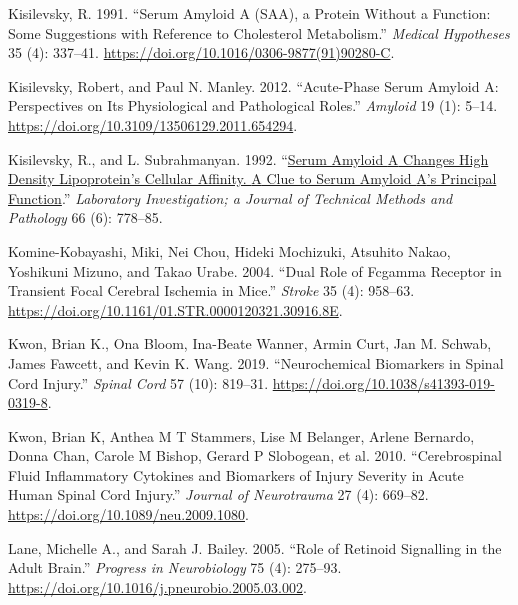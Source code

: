 \documentclass[9pt,lineno]{elife}
\newlength{\cslhangindent}
\newlength{\cslentryspacingunit} %
\newenvironment{CSLReferences}[2] %
 {%
  \setlength{\parindent}{0pt}
  \ifodd #1
  \let\oldpar\par
  \def\par{\hangindent=\cslhangindent\oldpar}
  \fi
  \setlength{\parskip}{#2\cslentryspacingunit}
 }%
 {}
\begin{document}
\begin{landscape}
\begin{landscape}
\begin{landscape}
\begin{landscape}
\begin{CSLReferences}{1}{0}
\leavevmode{}%
Kisilevsky, R. 1991. {``Serum Amyloid {A} ({SAA}), a Protein Without a Function: {Some} Suggestions with Reference to Cholesterol Metabolism.''} \emph{Medical Hypotheses} 35 (4): 337--41. \url{https://doi.org/10.1016/0306-9877(91)90280-C}.

\leavevmode{}%
Kisilevsky, Robert, and Paul N. Manley. 2012. {``Acute-Phase Serum Amyloid {A}: {Perspectives} on Its Physiological and Pathological Roles.''} \emph{Amyloid} 19 (1): 5--14. \url{https://doi.org/10.3109/13506129.2011.654294}.

\leavevmode{}%
Kisilevsky, R., and L. Subrahmanyan. 1992. {``\href{https://www.ncbi.nlm.nih.gov/pubmed/1602745}{Serum Amyloid {A} Changes High Density Lipoprotein's Cellular Affinity. {A} Clue to Serum Amyloid {A}'s Principal Function}.''} \emph{Laboratory Investigation; a Journal of Technical Methods and Pathology} 66 (6): 778--85.

\leavevmode{}%
Komine-Kobayashi, Miki, Nei Chou, Hideki Mochizuki, Atsuhito Nakao, Yoshikuni Mizuno, and Takao Urabe. 2004. {``Dual {Role} of {Fcgamma Receptor} in {Transient Focal Cerebral Ischemia} in {Mice}.''} \emph{Stroke} 35 (4): 958--63. \url{https://doi.org/10.1161/01.STR.0000120321.30916.8E}.

\leavevmode{}%
Kwon, Brian K., Ona Bloom, Ina-Beate Wanner, Armin Curt, Jan M. Schwab, James Fawcett, and Kevin K. Wang. 2019. {``Neurochemical Biomarkers in Spinal Cord Injury.''} \emph{Spinal Cord} 57 (10): 819--31. \url{https://doi.org/10.1038/s41393-019-0319-8}.

\leavevmode{}%
Kwon, Brian K, Anthea M T Stammers, Lise M Belanger, Arlene Bernardo, Donna Chan, Carole M Bishop, Gerard P Slobogean, et al. 2010. {``Cerebrospinal Fluid Inflammatory Cytokines and Biomarkers of Injury Severity in Acute Human Spinal Cord Injury.''} \emph{Journal of Neurotrauma} 27 (4): 669--82. \url{https://doi.org/10.1089/neu.2009.1080}.

\leavevmode{}%
Lane, Michelle A., and Sarah J. Bailey. 2005. {``Role of Retinoid Signalling in the Adult Brain.''} \emph{Progress in Neurobiology} 75 (4): 275--93. \url{https://doi.org/10.1016/j.pneurobio.2005.03.002}.


\end{CSLReferences}
\end{landscape}
\end{landscape}
\end{landscape}
\end{landscape}
\end{document}
